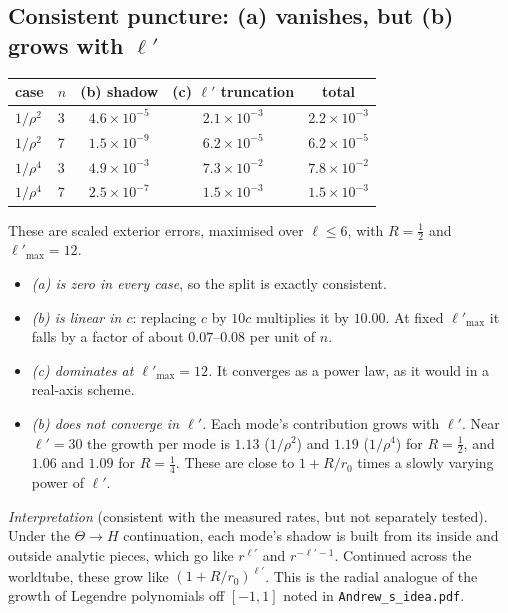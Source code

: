 \documentclass[11pt,a4paper]{article}
\newcommand{\nb}[1]{\nolinkurl{#1}}
\begin{document}
\subsection{Consistent puncture: (a) vanishes, but (b) grows with \texorpdfstring{$\ell'$}{l'}}
\begin{center}
\small
\renewcommand{\arraystretch}{1.15}
\begin{tabular}{@{}llccc@{}}
\toprule
case & $n$ & (b) shadow & (c) $\ell'$ truncation & total\\
\midrule
$1/\rho^2$ & 3 & $4.6\times10^{-5}$ & $2.1\times10^{-3}$ & $2.2\times10^{-3}$\\
$1/\rho^2$ & 7 & $1.5\times10^{-9}$ & $6.2\times10^{-5}$ & $6.2\times10^{-5}$\\
$1/\rho^4$ & 3 & $4.9\times10^{-3}$ & $7.3\times10^{-2}$ & $7.8\times10^{-2}$\\
$1/\rho^4$ & 7 & $2.5\times10^{-7}$ & $1.5\times10^{-3}$ & $1.5\times10^{-3}$\\
\bottomrule
\end{tabular}
\end{center}
These are scaled exterior errors, maximised over $\ell\le6$, with $R=\tfrac12$ and $\ell'_{\max}=12$.
\begin{itemize}[nosep]
\item \emph{(a) is zero in every case}, so the split is exactly consistent.
\item \emph{(b) is linear in $c$}: replacing $c$ by $10c$ multiplies it by $10.00$. At fixed $\ell'_{\max}$ it falls by a factor of about $0.07$--$0.08$ per unit of $n$.
\item \emph{(c) dominates at $\ell'_{\max}=12$.} It converges as a power law, as it would in a real-axis scheme.
\item \emph{(b) does not converge in $\ell'$.} Each mode's contribution grows with $\ell'$.
  Near $\ell'=30$ the growth per mode is $1.13$ ($1/\rho^2$) and $1.19$ ($1/\rho^4$) for $R=\tfrac12$, and $1.06$ and $1.09$ for $R=\tfrac14$.
  These are close to $1+R/r_0$ times a slowly varying power of $\ell'$.
\end{itemize}
\emph{Interpretation} (consistent with the measured rates, but not separately tested).
Under the $\Theta\to H$ continuation, each mode's shadow is built from its inside and outside analytic pieces, which go like $r^{\ell'}$ and $r^{-\ell'-1}$.
Continued across the worldtube, these grow like $(1+R/r_0)^{\ell'}$.
This is the radial analogue of the growth of Legendre polynomials off $[-1,1]$ noted in \nb{Andrew_s_idea.pdf}.
\end{document}
